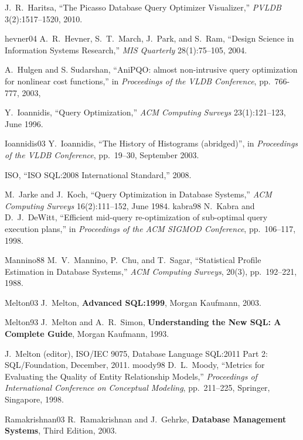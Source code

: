 \documentclass[prodmode,acmtods]{acmsmall}
\begin{document}
\begin{thebibliography}{99}
J.~R.~Haritsa, ``The Picasso Database Query Optimizer Visualizer,'' {\em
  PVLDB} 3(2):1517--1520, 2010.

\bibitem
{hevner04}
A.~R.~Hevner, S.~T.~March, J.~Park, and S.~Ram, ``Design Science in
Information Systems Research,'' {\em MIS Quarterly} 28(1):75--105, 2004.

A.~Hulgen and S. Sudarshan, ``AniPQO: almost non-intrusive query optimization
for nonlinear cost functions,'' in {\em Proceedings of the VLDB Conference},
pp.~766-777, 2003,

Y.~Ioannidis, ``Query Optimization,'' {\em ACM Computing Surveys}
23(1):121--123, June 1996.

\bibitem
{Ioannidis03}
Y.~Ioannidis, ``The History of Histograms (abridged)'', in {\em Proceedings
  of the VLDB Conference}, pp.~19--30, September 2003.

ISO, ``ISO SQL:2008 International Standard,'' 2008.

M.~Jarke and J.~Koch, ``Query Optimization in Database Systems,'' {\em ACM
  Computing Surveys} 16(2):111--152, June 1984.
\bibitem
{kabra98}
N.~Kabra and D.~J.~DeWitt, ``Efficient mid-query re-optimization of
sub-optimal query execution plans,'' in {\em Proceedings of the ACM SIGMOD Conference}, pp.~106--117, 1998.

\bibitem
{Mannino88}
M.~V.~Mannino, P.~Chu, and T.~Sagar, ``Statistical Profile Estimation in
Database Systems,'' {\em ACM Computing Surveys}, 20(3), pp.~192--221, 1988.

\bibitem
{Melton03}
J.~Melton, {\bf Advanced SQL:1999}, Morgan Kaufmann, 2003.

\bibitem
{Melton93}
J.~Melton and A.~R.~Simon, {\bf Understanding the New SQL: A Complete
  Guide}, Morgan Kaufmann, 1993.

J.~Melton (editor), ISO/IEC 9075, Database Language SQL:2011 Part 2:
SQL/Foundation, December, 2011.
\bibitem
{moody98} D.~L.~Moody, ``Metrics for Evaluating the Quality of Entity
Relationship Models,'' {\em Proceedings of International Conference on
  Conceptual Modeling}, pp.~211--225, Springer, Singapore, 1998.

\bibitem
{Ramakrishnan03}
R.~Ramakrishnan and J.~Gehrke, {\bf Database Management Systems}, Third
Edition, 2003.


\end{thebibliography}
\end{document}
